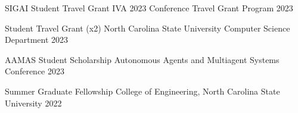 \vspace{-10pt}

\begin{cvhonors}

  \cvhonor
    {SIGAI Student Travel Grant} %
    {IVA 2023 Conference Travel Grant Program} %
    {}
    {2023} %



  \cvhonor
    {Student Travel Grant (x2)} %
    {North Carolina State University Computer Science Department} %
    {}
    {2023} %

  \cvhonor
    {AAMAS Student Scholarship} %
    {Autonomous Agents and Multiagent Systems Conference} %
    {}
    {2023} %

  \cvhonor
    {Summer Graduate Fellowship} %
    {College of Engineering, North Carolina State University} %
    {}
    {2022} %


\end{cvhonors}

